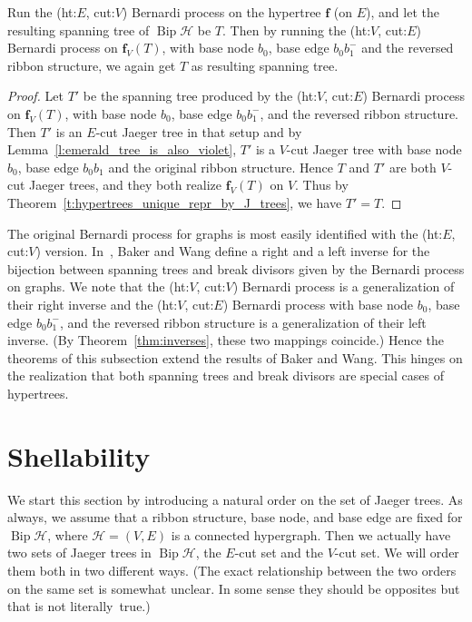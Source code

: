 \documentclass[ALCO,ThmDefs,Unicode,epreuves]{cedram}
\newcommand{\HH}{\mathcal H}
\DeclareMathOperator{\bip}{Bip}
\begin{document}
\begin{theo}
Run the (ht:$E$, cut:$V$) Bernardi process on the hypertree $\mathbf f$ (on $E$), and let the resulting spanning tree of $\bip \HH$ be $T$. Then by running the (ht:$V$, cut:$E$) Bernardi process on $\mathbf f_V(T)$, with base node $b_0$, base edge $b_0b_1^-$ and the reversed ribbon structure, we again get $T$ as resulting spanning tree.
\end{theo}

\begin{proof}
Let $T'$ be the spanning tree produced by the (ht:$V$, cut:$E$) Bernardi process on $\mathbf f_V(T)$, with base node $b_0$, base edge $b_0b_1^-$, and the reversed ribbon structure. Then $T'$ is an $E$-cut Jaeger tree in that setup and by Lemma~\ref{l:emerald_tree_is_also_violet}, $T'$ is a $V$-cut Jaeger tree with base node $b_0$, base edge $b_0b_1$ and the original ribbon structure. Hence $T$ and $T'$ are both $V$-cut Jaeger trees, and they both realize $\mathbf f_V(T)$ on $V$. Thus by Theorem~\ref{t:hypertrees_unique_repr_by_J_trees}, we have $T'=T$.
\end{proof}

\begin{rema}\label{rem:Bernardi_altalanosit_BW}
The original Bernardi process for graphs is most easily identified with the (ht:$E$, cut:$V$) version. In~\cite{Baker-Wang}, Baker and Wang define a right and a left inverse for the bijection between spanning trees and break divisors given by the Bernardi process on graphs. We note that the (ht:$V$, cut:$V$) Bernardi process is a generalization of their right inverse and the (ht:$V$, cut:$E$) Bernardi process with base node $b_0$, base edge $b_0b_1^-$, and the reversed ribbon structure is a generalization of their left inverse. (By Theorem~\ref{thm:inverses}, these two mappings coincide.) Hence the theorems of this subsection extend the results of Baker and Wang. This hinges on the realization that both spanning trees and break divisors are special cases of hypertrees.
\end{rema}



\section{Shellability}
\label{sec:shelling}

We start this section by introducing a natural order on the set of Jaeger trees. As always, we assume that a ribbon structure, base node, and base edge are fixed for $\bip\HH$, where $\HH = (V,E)$ is a connected hypergraph. Then we actually have two sets of Jaeger trees in $\bip\HH$, the $E$-cut set and the $V$-cut set. We will order them both in two different ways. (The exact relationship between the two orders on the same set is somewhat unclear. In some sense they should be opposites but that is not literally~true.)
\end{document}
